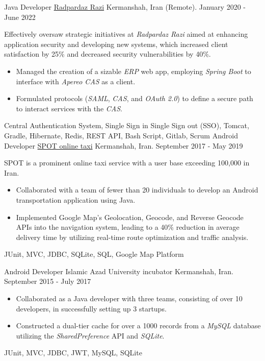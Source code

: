 \begin{experiences}
  \emptySeparator 
\experience
{}
{Java Developer}
{\href{https://raadpardaz.ir/}{Radpardaz Razi}}
{Kermanshah, Iran {\scriptsize{(Remote)}}. \hspace{150 pt} January 2020 - June 2022}
{}
{
\par{Effectively oversaw strategic initiatives at \emph{Radpardaz Razi} aimed at enhancing application security and developing new systems, which increased client satisfaction by 25\% and decreased security vulnerabilities by 40\%.}
\begin{itemize}
\item Managed the creation of a sizable \emph{ERP} web app, employing \emph{Spring Boot} to interface with \emph{Apereo CAS} as a client.
\item Formulated protocols (\emph{SAML}, \emph{CAS}, and \emph{OAuth 2.0}) to define a secure path to interact services with the \textit{CAS}.
\end{itemize}
}{Central Authentication System, Single Sign in Single Sign out (SSO), Tomcat, Gradle, Hibernate, Redis, REST API, Bash Script, Gitlab, Scrum}
\emptySeparator
\experience
  {}
  {Android Developer}
  {\href{https://www.spotbar.ir/}{SPOT online taxi}}
  {Kermanshah, Iran. \hspace{140 pt} September 2017 - May 2019}
  {}
  {
  SPOT is a prominent online taxi service with a user base exceeding 100,000 in Iran. 
  \begin{itemize}
    \item Collaborated with a team of fewer than 20 individuals to develop an Android transportation application using Java.
    \item Implemented Google Map's Geolocation, Geocode, and Reverse Geocode APIs into the navigation system, leading to a 40\% reduction in average delivery time by utilizing real-time route optimization and traffic analysis. \end{itemize}
  }{JUnit, MVC, JDBC, SQLite, SQL, Google Map Platform}

\emptySeparator

\experience
{}
{Android Developer}
{Islamic Azad University incubator}
{Kermanshah, Iran. \hspace{60 pt} September 2015 - July 2017}
{}
{
\begin{itemize}
\item Collaborated as a Java developer with three teams, consisting of over 10 developers, in successfully setting up 3 startups.
\item Constructed a dual-tier cache for over a 1000 records from a \emph{MySQL} database utilizing the \emph{SharedPreference} API and \emph{SQLite}.
\end{itemize}
}{JUnit, MVC, JDBC, JWT, MySQL, SQLite}
\end{experiences}
